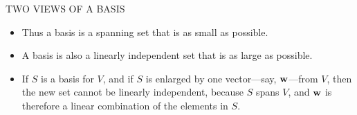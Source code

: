 \begin{frame}{TWO VIEWS OF A BASIS}
\begin{itemize}
\item Thus a basis is a spanning set that is as small as possible.
\item A basis is also a linearly independent set that is as large as possible.
\item If $S$ is a basis for $V$, and if $S$ is enlarged by one vector---say, $\mathbf{w}$---from $V$, then the new set cannot be linearly independent, because $S$ spans $V$, and $\mathbf{w}$ is therefore a linear combination of the elements in $S$.
\end{itemize}
\end{frame}
